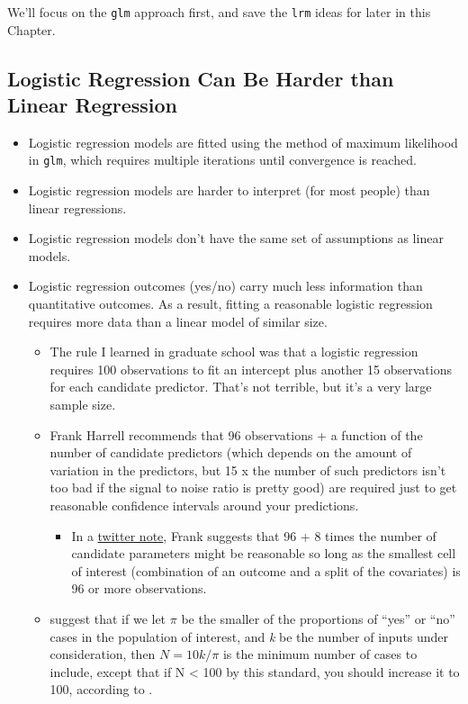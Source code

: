 \documentclass[]{book}
\providecommand{\tightlist}{%
  \setlength{\itemsep}{0pt}\setlength{\parskip}{0pt}}
\theoremstyle{definition}
\theoremstyle{definition}
\theoremstyle{definition}
\theoremstyle{remark}
\begin{document}
We'll focus on the \texttt{glm} approach first, and save the
\texttt{lrm} ideas for later in this Chapter.

\subsection{Logistic Regression Can Be Harder than Linear
Regression}\label{logistic-regression-can-be-harder-than-linear-regression}

\begin{itemize}
\tightlist
\item
  Logistic regression models are fitted using the method of maximum
  likelihood in \texttt{glm}, which requires multiple iterations until
  convergence is reached.
\item
  Logistic regression models are harder to interpret (for most people)
  than linear regressions.
\item
  Logistic regression models don't have the same set of assumptions as
  linear models.
\item
  Logistic regression outcomes (yes/no) carry much less information than
  quantitative outcomes. As a result, fitting a reasonable logistic
  regression requires more data than a linear model of similar size.

  \begin{itemize}
  \tightlist
  \item
    The rule I learned in graduate school was that a logistic regression
    requires 100 observations to fit an intercept plus another 15
    observations for each candidate predictor. That's not terrible, but
    it's a very large sample size.
  \item
    Frank Harrell recommends that 96 observations + a function of the
    number of candidate predictors (which depends on the amount of
    variation in the predictors, but 15 x the number of such predictors
    isn't too bad if the signal to noise ratio is pretty good) are
    required just to get reasonable confidence intervals around your
    predictions.

    \begin{itemize}
    \tightlist
    \item
      In a
      \href{https://twitter.com/f2harrell/status/936230071219707913}{twitter
      note}, Frank suggests that 96 + 8 times the number of candidate
      parameters might be reasonable so long as the smallest cell of
      interest (combination of an outcome and a split of the covariates)
      is 96 or more observations.
    \end{itemize}
  \item
    \citet{Peduzzi1996} suggest that if we let \(\pi\) be the smaller of
    the proportions of ``yes'' or ``no'' cases in the population of
    interest, and \emph{k} be the number of inputs under consideration,
    then \(N = 10k/\pi\) is the minimum number of cases to include,
    except that if N \textless{} 100 by this standard, you should
    increase it to 100, according to \citet{Long1997}.


\end{itemize}
\end{itemize}
\end{document}

